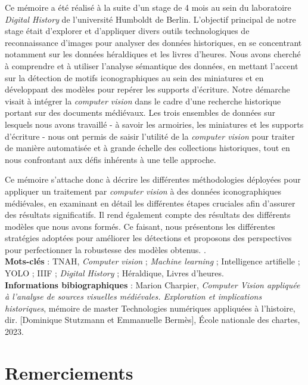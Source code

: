 \documentclass[12pt,twoside]{book}
\begin{document}
\medskip
Ce mémoire a été réalisé à la suite d’un stage de 4 mois au sein du laboratoire \textit{Digital History} de l’université Humboldt de Berlin. L'objectif principal de notre stage était d'explorer et d'appliquer divers outils technologiques de reconnaissance d'images pour analyser des données historiques, en se concentrant notamment sur les données héraldiques et les livres d'heures. Nous avons cherché à comprendre et à utiliser l'analyse sémantique des données, en mettant l'accent sur la détection de motifs iconographiques au sein des miniatures et en développant des modèles pour repérer les supports d'écriture. Notre démarche visait à intégrer la \textit{computer vision} dans le cadre d'une recherche historique portant sur des documents médiévaux. Les trois ensembles de données sur lesquels nous avons travaillé - à savoir les armoiries, les miniatures et les supports d'écriture - nous ont permis de saisir l'utilité de la \textit{computer vision }pour traiter de manière automatisée et à grande échelle des collections historiques, tout en nous confrontant aux défis inhérents à une telle approche.

Ce mémoire s’attache donc à décrire les différentes méthodologies déployées pour appliquer un traitement par \textit{computer vision} à des données iconographiques médiévales, en examinant en détail les différentes étapes cruciales afin d’assurer des résultats significatifs. Il rend également compte des résultats des différents modèles que nous avons formés. Ce faisant, nous présentons les différentes stratégies adoptées pour améliorer les détections et proposons des perspectives pour perfectionner la robustesse des modèles obtenus. 
.\\

\textbf{Mots-clés} : TNAH, \textit{Computer vision} ; \textit{Machine learning} ; Intelligence artifielle ; YOLO ; IIIF ; \textit{Digital History} ; Héraldique, Livres d'heures. \\

\textbf{Informations bibiographiques} : Marion Charpier, \textit{Computer Vision appliquée à l'analyse de sources visuelles médiévales. Exploration et implications historiques}, mémoire de master \og Technologies numériques appliquées à l'histoire\fg , dir. [Dominique Stutzmann et Emmanuelle Bermès], École nationale des chartes, 2023.

\chapter{Remerciements}
\end{document}
